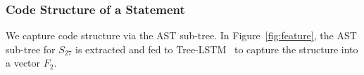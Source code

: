 




\vspace{-1pt}
\subsubsection{Code Structure of a Statement}

We capture code structure via the AST sub-tree.
In Figure~\ref{fig:feature}, the AST sub-tree for $S_{27}$ is
extracted and fed to Tree-LSTM~\cite{tai2015improved} to capture the
structure into a vector $F_2$.



